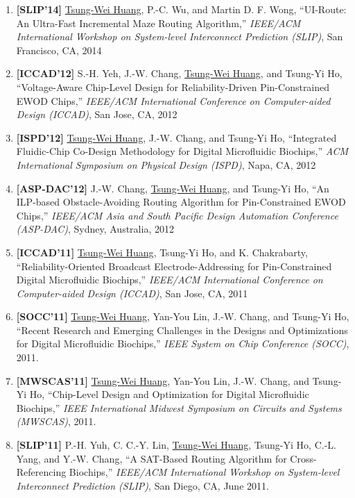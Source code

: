\documentclass[A4,11pt]{article}
\begin{document}
\begin{enumerate}
    \item \textbf{[SLIP'14]} \underline{Tsung-Wei Huang}, P.-C. Wu, and Martin D. F. Wong, ``UI-Route: An Ultra-Fast Incremental Maze Routing Algorithm,'' \textit{IEEE/ACM International Workshop on System-level Interconnect Prediction (SLIP)}, San Francisco, CA, 2014

    \item \textbf{[ICCAD'12]} S.-H. Yeh, J.-W. Chang, \underline{Tsung-Wei Huang}, and Tsung-Yi Ho, ``Voltage-Aware Chip-Level Design for Reliability-Driven Pin-Constrained EWOD Chips,'' \textit{IEEE/ACM International Conference on Computer-aided Design (ICCAD)}, San Jose, CA, 2012

    \item \textbf{[ISPD'12]} \underline{Tsung-Wei Huang}, J.-W. Chang, and Tsung-Yi Ho, ``Integrated Fluidic-Chip Co-Design Methodology for Digital Microfluidic Biochips,'' \textit{ACM International Symposium on Physical Design (ISPD)}, Napa, CA, 2012

    \item \textbf{[ASP-DAC'12]} J.-W. Chang, \underline{Tsung-Wei Huang}, and Tsung-Yi Ho, ``An ILP-based Obstacle-Avoiding Routing Algorithm for Pin-Constrained EWOD Chips,'' \textit{IEEE/ACM Asia and South Pacific Design Automation Conference (ASP-DAC)}, Sydney, Australia, 2012

    \item \textbf{[ICCAD'11]} \underline{Tsung-Wei Huang}, Tsung-Yi Ho, and K. Chakrabarty, ``Reliability-Oriented Broadcast Electrode-Addressing for Pin-Constrained Digital Microfluidic Biochips,'' \textit{IEEE/ACM International Conference on Computer-aided Design (ICCAD)}, San Jose, CA, 2011

    \item \textbf{[SOCC'11]} \underline{Tsung-Wei Huang}, Yan-You Lin, J.-W. Chang, and Tsung-Yi Ho, ``Recent Research and Emerging Challenges in the Designs and Optimizations for Digital Microfluidic Biochips,'' \textit{IEEE System on Chip Conference (SOCC)}, 2011. 
    \item \textbf{[MWSCAS'11]} \underline{Tsung-Wei Huang}, Yan-You Lin, J.-W. Chang, and Tsung-Yi Ho, ``Chip-Level Design and Optimization for Digital Microfluidic Biochips,'' \textit{IEEE International Midwest Symposium on Circuits and Systems (MWSCAS)}, 2011. 
    
    \item \textbf{[SLIP'11]} P.-H. Yuh, C. C.-Y. Lin, \underline{Tsung-Wei Huang}, Tsung-Yi Ho, C.-L. Yang, and Y.-W. Chang, ``A SAT-Based Routing Algorithm for Cross-Referencing Biochips,'' \textit{IEEE/ACM International Workshop on System-level Interconnect Prediction (SLIP)}, San Diego, CA, June 2011.


\end{enumerate}
\end{document}
